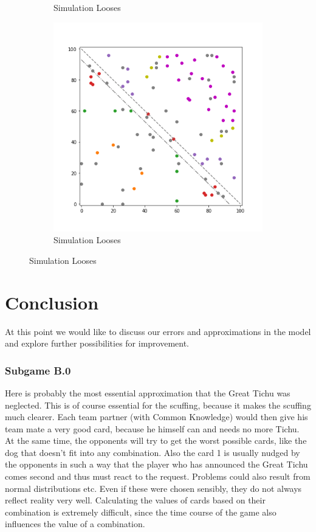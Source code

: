 \begin{figure}[!ht]
\begin{subfigure}{.3\textwidth}
    	\caption{Simulation Looses}
    \end{subfigure}%
	\begin{subfigure}{.3\textwidth}%
    	\centering
    	\includegraphics[width=1\linewidth]{Bilder/simulation_4_5}
    	\caption{Simulation Looses}
	\end{subfigure}
\end{figure}
\newpage

\section{Conclusion}
At this point we would like to discuss our errors and approximations in the model and explore further possibilities for improvement.

\subsubsection{Subgame B.0}
Here is probably the most essential approximation that the Great Tichu was neglected. This is of course essential for the scuffing, because it makes the scuffing much clearer. Each team partner (with Common Knowledge) would then give his team mate a very good card, because he himself can and needs no more Tichu. At the same time, the opponents will try to get the worst possible cards, like the dog that doesn't fit into any combination. Also the card 1 is usually nudged by the opponents in such a way that the player who has announced the Great Tichu comes second and thus must react to the request.
Problems could also result from normal distributions etc. Even if these were chosen sensibly, they do not always reflect reality very well. Calculating the values of cards based on their combination is extremely difficult, since the time course of the game also influences the value of a combination.

